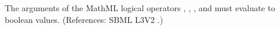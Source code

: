 The arguments of the MathML logical operators , ,
, and  must evaluate to boolean values.  (References:
SBML L3V2 .)

